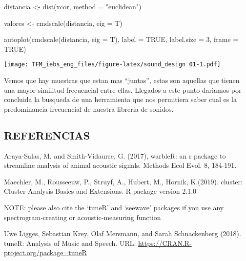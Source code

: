 \documentclass[
]{article}
\newenvironment{Shaded}{\begin{snugshade}}{\end{snugshade}}
\newcommand{\AttributeTok}[1]{\textcolor[rgb]{0.77,0.63,0.00}{#1}}
\newcommand{\ConstantTok}[1]{\textcolor[rgb]{0.00,0.00,0.00}{#1}}
\newcommand{\DecValTok}[1]{\textcolor[rgb]{0.00,0.00,0.81}{#1}}
\newcommand{\FunctionTok}[1]{\textcolor[rgb]{0.00,0.00,0.00}{#1}}
\newcommand{\NormalTok}[1]{#1}
\newcommand{\OtherTok}[1]{\textcolor[rgb]{0.56,0.35,0.01}{#1}}
\newcommand{\StringTok}[1]{\textcolor[rgb]{0.31,0.60,0.02}{#1}}
\begin{document}
\begin{Shaded}
\begin{Highlighting}[]
\NormalTok{distancia }\OtherTok{\textless{}{-}} \FunctionTok{dist}\NormalTok{(xcor, }\AttributeTok{method =} \StringTok{"euclidean"}\NormalTok{)}
  
\NormalTok{valores }\OtherTok{\textless{}{-}} \FunctionTok{cmdscale}\NormalTok{(distancia, }\AttributeTok{eig =}\NormalTok{ T)}



\FunctionTok{autoplot}\NormalTok{(}\FunctionTok{cmdscale}\NormalTok{(distancia, }\AttributeTok{eig =}\NormalTok{ T), }\AttributeTok{label =} \ConstantTok{TRUE}\NormalTok{, }\AttributeTok{label.size =} \DecValTok{3}\NormalTok{, }\AttributeTok{frame =} \ConstantTok{TRUE}\NormalTok{)}
\end{Highlighting}
\end{Shaded}

\texttt{[image: TFM\_iebs\_eng\_files/figure-latex/sound\_design 01-1.pdf]}

Vemos que hay muestras que estan mas ``juntas'', estas son aquellas que
tienen una mayor similitud frecuencial entre ellas. Llegados a este
punto dariamos por concluida la busqueda de una herramienta que nos
permitiera saber cual es la predominancia frecuencial de nuestra
libreria de sonidos.

\vspace{15pt}

\newpage

\hypertarget{referencias}{%
\subsection{REFERENCIAS}\label{referencias}}

\vspace{15pt}

Araya-Salas, M. and Smith-Vidaurre, G. (2017), warbleR: an r package to
streamline analysis of animal acoustic signals. Methods Ecol Evol. 8,
184-191.

Maechler, M., Rousseeuw, P., Struyf, A., Hubert, M., Hornik, K.(2019).
cluster: Cluster Analysis Basics and Extensions. R package version 2.1.0

NOTE: please also cite the `tuneR' and `seewave' packages if you use any
spectrogram-creating or acoustic-measuring function

Uwe Ligges, Sebastian Krey, Olaf Mersmann, and Sarah Schnackenberg
(2018). tuneR: Analysis of Music and Speech. URL:
\url{https://CRAN.R-project.org/package=tuneR}
\end{document}
